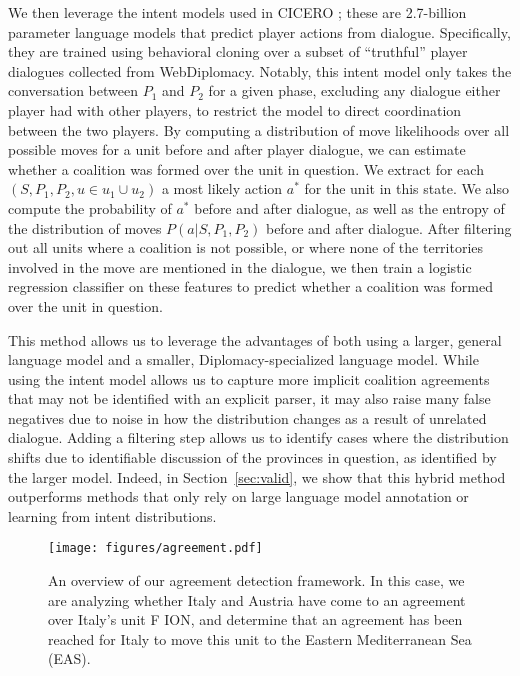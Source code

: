 We then leverage the intent models used in CICERO \citep{CICERO}; these are 2.7-billion parameter language models that predict player actions from dialogue. Specifically, they are trained using behavioral cloning over a subset of ``truthful'' player dialogues collected from WebDiplomacy. Notably, this intent model only takes the conversation between $P_1$ and $P_2$ for a given phase, excluding any dialogue either player had with other players, to restrict the model to direct coordination between the two players.  By computing a distribution of move likelihoods over all possible moves for a unit before and after player dialogue, we can estimate whether a coalition was formed over the unit in question. We extract for each $(S, P_1, P_2, u \in u_1 \cup u_2)$ a most likely action $a^*$ for the unit in this state. We also compute the probability of $a^*$ before and after dialogue, as well as the entropy of the distribution of moves $P(a | S, P_1, P_2)$ before and after dialogue. After filtering out all units where a coalition is not possible, or where none of the territories involved in the move are mentioned in the dialogue, we then train a logistic regression classifier on these features to predict whether a coalition was formed over the unit in question.

This method allows us to leverage the advantages of both using a larger, general language model and a smaller, Diplomacy-specialized language model. While using the intent model allows us to capture more implicit coalition agreements that may not be identified with an explicit parser, it may also raise many false negatives due to noise in how the distribution changes as a result of unrelated dialogue. Adding a filtering step allows us to identify cases where the distribution shifts due to identifiable discussion of the provinces in question, as identified by the larger model. Indeed, in Section~\ref{sec:valid}, we show that this hybrid method outperforms methods that only rely on large language model annotation or learning from intent distributions.

\begin{figure*}
    \texttt{[image: figures/agreement.pdf]}
    \caption{An overview of our agreement detection framework. In this case, we are analyzing whether Italy and Austria have come to an agreement over Italy's unit F ION, and determine that an agreement has been reached for Italy to move this unit to the Eastern Mediterranean Sea (EAS).}
    \label{fig:detection}
\end{figure*}

